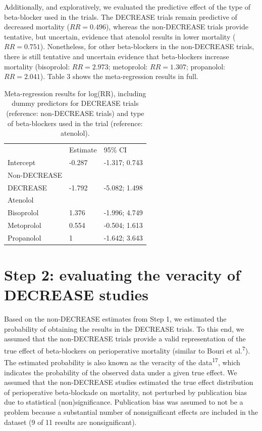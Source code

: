 \documentclass[]{article}
\begin{document}
Additionally, and exploratively, we evaluated the predictive effect of
the type of beta-blocker used in the trials. The DECREASE trials remain
predictive of decreased mortality (\(RR=0.496\)), whereas the
non-DECREASE trials provide tentative, but uncertain, evidence that
atenolol results in lower mortality (\(RR=0.751\)). Nonetheless, for
other beta-blockers in the non-DECREASE trials, there is still tentative
and uncertain evidence that beta-blockers increase mortality
(bisoprolol: \(RR=2.973\); metoprolol: \(RR=1.307\); propanolol:
\(RR=2.041\)). Table 3 shows the meta-regression results in full.

\begin{longtable}[]{@{}lll@{}}
\caption{Meta-regression results for log(RR), including dummy predictors
for DECREASE trials (reference: non-DECREASE trials) and type of
beta-blockers used in the trial (reference: atenolol).}\tabularnewline
\toprule
& Estimate & 95\% CI\tabularnewline
Intercept & -0.287 & -1.317; 0.743\tabularnewline
Non-DECREASE & &\tabularnewline
DECREASE & -1.792 & -5.082; 1.498\tabularnewline
Atenolol & &\tabularnewline
Bisoprolol & 1.376 & -1.996; 4.749\tabularnewline
Metoprolol & 0.554 & -0.504; 1.613\tabularnewline
Propanolol & 1 & -1.642; 3.643\tabularnewline
\bottomrule
\end{longtable}

\section{Step 2: evaluating the veracity of DECREASE
studies}\label{step-2-evaluating-the-veracity-of-decrease-studies}

Based on the non-DECREASE estimates from Step 1, we estimated the
probability of obtaining the results in the DECREASE trials. To this
end, we assumed that the non-DECREASE trials provide a valid
representation of the true effect of beta-blockers on perioperative
mortality (similar to Bouri et al.\textsuperscript{7}). The estimated
probability is also known as the veracity of the
data\textsuperscript{17}, which indicates the probability of the
observed data under a given true effect. We assumed that the
non-DECREASE studies estimated the true effect distribution of
perioperative beta-blockade on mortality, not perturbed by publication
bias due to statistical (non)significance. Publication bias was assumed
to not be a problem because a substantial number of nonsignificant
effects are included in the dataset (9 of 11 results are
nonsignificant).
\end{document}
